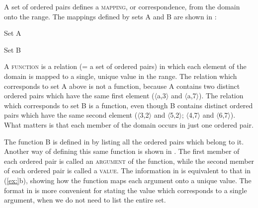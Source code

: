 A set of ordered pairs defines a \textsc{mapping}, or correspondence, from the domain onto the range. The mappings defined by sets A and B are shown in :

\ea
\ea  Set A\\
\ex  Set B\\

\z \z


A \textsc{function} is a relation (= a set of ordered pairs) in which each element of the domain is mapped to a single, unique value in the range. The relation which corresponds to set A above is not a function, because A contains two distinct ordered pairs which have the same first element ($\langle$a,3$\rangle$ and $\langle$a,7$\rangle$). The relation which corresponds to set B is a function, even though B contains distinct ordered pairs which have the same second element ($\langle$3,2$\rangle$ and $\langle$5,2$\rangle$; $\langle$4,7$\rangle$ and $\langle$6,7$\rangle$). What matters is that each member of the domain occurs in just one ordered pair.



The function B is defined in  by listing all the ordered pairs which belong to it. Another way of defining this same function is shown in . The first member of each ordered pair is called an \textsc{argument} of the function, while the second member of each ordered pair is called a \textsc{value}. The information in  is equivalent to that in (\ref{ex:}b), showing how the function maps each argument onto a unique value. The format in  is more convenient for stating the value which corresponds to a single argument, when we do not need to list the entire set.


